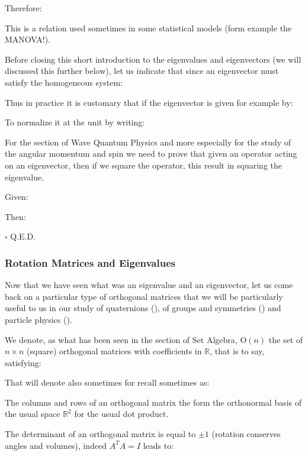 	Therefore:
	
	This is a relation used sometimes in some statistical models (form example the MANOVA!). 
	
	Before closing this short introduction to the eigenvalues and eigenvectors (we will discussed this further below), let us indicate that since an eigenvector must satisfy the homogeneous system:
	
	
	Thus in practice it is customary that if the eigenvector is given for example by:
	
	To normalize it at the unit by writing:
	
	
	For the section of Wave Quantum Physics and more especially for the study of the angular momentum and spin we need to prove that given an operator acting on an eigenvector, then if we square the operator, this result in squaring the eigenvalue.
	\begin{dem}
	Given:
	
	Then:
	
	\begin{flushright}
		$\square$  Q.E.D.
	\end{flushright}
	\end{dem}
	
	\subsubsection{Rotation Matrices and Eigenvalues}
	Now that we have seen what was an eigenvalue and an eigenvector, let us come back on a particular type of orthogonal matrices that we will be particularly useful to us in our study of quaternions (), of groups and symmetries () and particle physics ().
	
	We denote, as what has been seen in the section of Set Algebra, $\text{O}(n)$ the set of $n\times n$ (square) orthogonal matrices with coefficients in $\mathbb{R}$, that is to say, satisfying:
	
	That will denote also sometimes for recall sometimes as:
	
	The columns and rows of an orthogonal matrix the form the orthonormal basis of the usual space $\mathbb{R}^2$ for the usual dot product.
	
	The determinant of an orthogonal matrix is equal to $\pm 1$ (rotation conserves angles and volumes), indeed $A^T A=I$  leads to:
	
